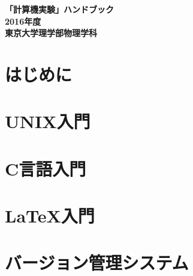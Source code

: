 \documentclass[a4j]{jsbook}
\newcommand{\nendo}{2016}
\begin{document}
\thispagestyle{empty}
\pagestyle{empty}
\begin{titlepage}
\vspace*{5cm}
\begin{center}
{\Huge\bf 「計算機実験」ハンドブック}\\
\vspace*{14cm}
{\LARGE\bf \nendo 年度}\\
\vspace{1.0cm}
{\LARGE\bf 東京大学理学部物理学科}
\end{center}
\end{titlepage}
\clearpage
\pagestyle{plain}
\cleardoublepage

\setcounter{page}{1}
\tableofcontents
\cleardoublepage

\chapter{はじめに}


\chapter{UNIX入門}


\chapter{C言語入門}


\chapter{\LaTeX 入門}


\chapter{バージョン管理システム}


%


%
\end{document}
